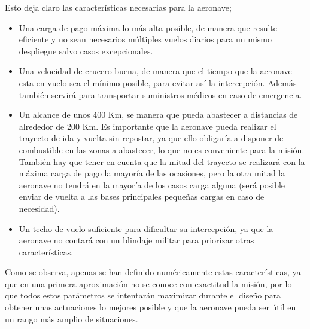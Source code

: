 Esto deja claro las características necesarias para la aeronave; 
\begin{itemize}
	\item Una carga de pago máxima lo más alta posible, de manera que resulte eficiente y no sean necesarios múltiples vuelos diarios para un mismo despliegue salvo casos excepcionales.
	\item Una velocidad de crucero buena, de manera que el tiempo que la aeronave esta en vuelo sea el mínimo posible, para evitar así la intercepción. Además también servirá para transportar suministros médicos en caso de emergencia.
	\item Un alcance de unos 400 Km, se manera que pueda abastecer a distancias de alrededor de 200 Km. Es importante que la aeronave pueda realizar el trayecto de ida y vuelta sin repostar, ya que ello obligaría a disponer de combustible en las zonas a abastecer, lo que no es conveniente para la misión. También hay que tener en cuenta que la mitad del trayecto se realizará con la máxima carga de pago la mayoría de las ocasiones, pero la otra mitad la aeronave no tendrá en la mayoría de los casos carga alguna (será posible enviar de vuelta a las bases principales pequeñas cargas en caso de necesidad).
	\item Un techo de vuelo suficiente para dificultar su intercepción, ya que la aeronave no contará con un blindaje militar para priorizar otras características.
\end{itemize}
Como se observa, apenas se han definido numéricamente estas características, ya que en una primera aproximación no se conoce con exactitud la misión, por lo que todos estos parámetros se intentarán maximizar durante el diseño para obtener unas actuaciones lo mejores posible y que la aeronave pueda ser útil en un rango más amplio de situaciones.


